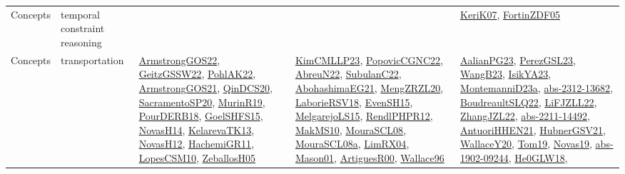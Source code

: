 {\begin{longtable}{lp{3cm}>{\raggedright}p{6cm}>{\raggedright}p{6cm}p{8cm}}
Concepts & temporal constraint reasoning &  &  & \href{papers/KeriK07.pdf}{KeriK07}\cite{KeriK07}, \href{papers/FortinZDF05.pdf}{FortinZDF05}\cite{FortinZDF05}\\
Concepts & transportation & \href{papers/ArmstrongGOS22.pdf}{ArmstrongGOS22}\cite{ArmstrongGOS22}, \href{papers/GeitzGSSW22.pdf}{GeitzGSSW22}\cite{GeitzGSSW22}, \href{articles/PohlAK22.pdf}{PohlAK22}\cite{PohlAK22}, \href{papers/ArmstrongGOS21.pdf}{ArmstrongGOS21}\cite{ArmstrongGOS21}, \href{articles/QinDCS20.pdf}{QinDCS20}\cite{QinDCS20}, \href{articles/SacramentoSP20.pdf}{SacramentoSP20}\cite{SacramentoSP20}, \href{papers/MurinR19.pdf}{MurinR19}\cite{MurinR19}, \href{articles/PourDERB18.pdf}{PourDERB18}\cite{PourDERB18}, \href{articles/GoelSHFS15.pdf}{GoelSHFS15}\cite{GoelSHFS15}, \href{articles/NovasH14.pdf}{NovasH14}\cite{NovasH14}, \href{papers/KelarevaTK13.pdf}{KelarevaTK13}\cite{KelarevaTK13}, \href{articles/NovasH12.pdf}{NovasH12}\cite{NovasH12}, \href{articles/HachemiGR11.pdf}{HachemiGR11}\cite{HachemiGR11}, \href{articles/LopesCSM10.pdf}{LopesCSM10}\cite{LopesCSM10}, \href{articles/ZeballosH05.pdf}{ZeballosH05}\cite{ZeballosH05} & \href{papers/KimCMLLP23.pdf}{KimCMLLP23}\cite{KimCMLLP23}, \href{papers/PopovicCGNC22.pdf}{PopovicCGNC22}\cite{PopovicCGNC22}, \href{articles/AbreuN22.pdf}{AbreuN22}\cite{AbreuN22}, \href{articles/SubulanC22.pdf}{SubulanC22}\cite{SubulanC22}, \href{articles/AbohashimaEG21.pdf}{AbohashimaEG21}\cite{AbohashimaEG21}, \href{articles/MengZRZL20.pdf}{MengZRZL20}\cite{MengZRZL20}, \href{articles/LaborieRSV18.pdf}{LaborieRSV18}\cite{LaborieRSV18}, \href{papers/EvenSH15.pdf}{EvenSH15}\cite{EvenSH15}, \href{papers/MelgarejoLS15.pdf}{MelgarejoLS15}\cite{MelgarejoLS15}, \href{papers/RendlPHPR12.pdf}{RendlPHPR12}\cite{RendlPHPR12}, \href{papers/MakMS10.pdf}{MakMS10}\cite{MakMS10}, \href{papers/MouraSCL08.pdf}{MouraSCL08}\cite{MouraSCL08}, \href{papers/MouraSCL08a.pdf}{MouraSCL08a}\cite{MouraSCL08a}, \href{papers/LimRX04.pdf}{LimRX04}\cite{LimRX04}, \href{articles/Mason01.pdf}{Mason01}\cite{Mason01}, \href{articles/ArtiguesR00.pdf}{ArtiguesR00}\cite{ArtiguesR00}, \href{articles/Wallace96.pdf}{Wallace96}\cite{Wallace96} & \href{papers/AalianPG23.pdf}{AalianPG23}\cite{AalianPG23}, \href{papers/PerezGSL23.pdf}{PerezGSL23}\cite{PerezGSL23}, \href{papers/WangB23.pdf}{WangB23}\cite{WangB23}, \href{articles/IsikYA23.pdf}{IsikYA23}\cite{IsikYA23}, \href{articles/MontemanniD23a.pdf}{MontemanniD23a}\cite{MontemanniD23a}, \href{articles/abs-2312-13682.pdf}{abs-2312-13682}\cite{abs-2312-13682}, \href{papers/BoudreaultSLQ22.pdf}{BoudreaultSLQ22}\cite{BoudreaultSLQ22}, \href{papers/LiFJZLL22.pdf}{LiFJZLL22}\cite{LiFJZLL22}, \href{papers/ZhangJZL22.pdf}{ZhangJZL22}\cite{ZhangJZL22}, \href{articles/abs-2211-14492.pdf}{abs-2211-14492}\cite{abs-2211-14492}, \href{papers/AntuoriHHEN21.pdf}{AntuoriHHEN21}\cite{AntuoriHHEN21}, \href{articles/HubnerGSV21.pdf}{HubnerGSV21}\cite{HubnerGSV21}, \href{articles/WallaceY20.pdf}{WallaceY20}\cite{WallaceY20}, \href{papers/Tom19.pdf}{Tom19}\cite{Tom19}, \href{articles/Novas19.pdf}{Novas19}\cite{Novas19}, \href{articles/abs-1902-09244.pdf}{abs-1902-09244}\cite{abs-1902-09244}, \href{papers/He0GLW18.pdf}{He0GLW18}\cite{He0GLW18}, 
\end{longtable}}
